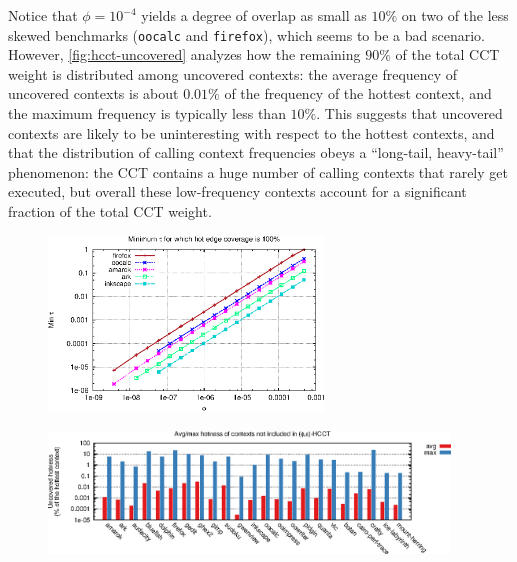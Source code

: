 Notice that $\phi=10^{-4}$ yields a degree of overlap as small as $10\%$ on two of the less skewed benchmarks ({\tt oocalc} and {\tt firefox}), which seems to be a bad scenario. However, \myfigure\ref{fig:hcct-uncovered} analyzes how the remaining $90\%$ of the total CCT weight is distributed among uncovered contexts: the average frequency of uncovered contexts is about $0.01\%$ of the frequency of the hottest context, and the maximum frequency is typically less than $10\%$. This suggests that uncovered contexts are likely to be uninteresting with respect to the hottest contexts, and that the distribution of calling context frequencies obeys a ``long-tail, heavy-tail'' phenomenon: the CCT contains a huge number of calling contexts that rarely get executed, but overall these low-frequency contexts account for a significant fraction of the total CCT weight.

\ifdefined\noauthorea
\begin{figure}[!ht]
\begin{center}
\includegraphics[width=0.65\textwidth]{figures/hcct-coverage/hcct-coverage.eps}\\
\caption{\protect}
\end{center}
\end{figure}
\fi

\ifdefined\noauthorea
\begin{figure}[!ht]
\begin{center}
\includegraphics[width=0.95\textwidth]{figures/hcct-uncovered/hcct-uncovered.eps}\\
\caption{\protect}
\end{center}
\end{figure}
\fi

